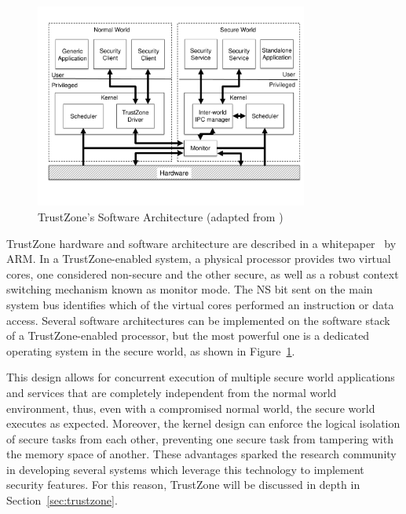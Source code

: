 \begin{figure}[t!]
	\centering
	\includegraphics[width=0.80\textwidth]{img/trustzone.pdf}
	\caption{TrustZone's Software Architecture (adapted from \cite{trustzone_whitepaper})}
	\label{fig:trustzone_architecture}
\end{figure}

TrustZone hardware and software architecture are described in a whitepaper~\cite{trustzone_whitepaper} by ARM. In a TrustZone-enabled system, a physical processor provides two virtual cores, one considered non-secure and the other secure, as well as a robust context switching mechanism known as monitor mode. The NS bit sent on the main system bus identifies which of the virtual cores performed an instruction or data access. Several software architectures can be implemented on the software stack of a TrustZone-enabled processor, but the most powerful one is a dedicated operating system in the secure world, as shown in Figure~\ref{fig:trustzone_architecture}.

This design allows for concurrent execution of multiple secure world applications and services that are completely independent from the normal world environment, thus, even with a compromised normal world, the secure world executes as expected. Moreover, the kernel design can enforce the logical isolation of secure tasks from each other, preventing one secure task from tampering with the memory space of another. These advantages sparked the research community in developing several systems which leverage this technology to implement security features. For this reason, TrustZone will be discussed in depth in Section~\ref{sec:trustzone}.


